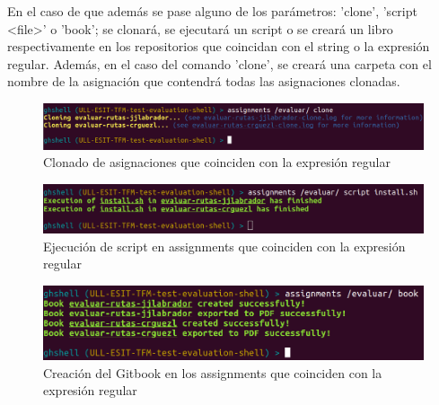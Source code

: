 \begin{itemize}
		
		En el caso de que además se pase alguno de los parámetros: 'clone', 'script \textless file\textgreater' o 'book'; se clonará, se ejecutará un script o se creará un libro respectivamente en los repositorios que coincidan con el string o la expresión regular. 
\bigskip		
		Además, en el caso del comando 'clone', se creará una carpeta con el nombre de la asignación que contendrá todas las asignaciones clonadas.
	
		\begin{figure}[H]
		\begin{center}
		\includegraphics[width=1\textwidth]{images/ghshell6-1}
		\caption{Clonado de asignaciones que coinciden con la expresión regular}
		\label{fig:ghshell6-1}
		\end{center}
		\end{figure}
		
		\begin{figure}[H]
		\begin{center}
		\includegraphics[width=1\textwidth]{images/assignments1-2}
		\caption{Ejecución de script en assignments que coinciden con la expresión regular}
		\label{fig:assignment1-2}
		\end{center}
		\end{figure}
		
		\begin{figure}[H]
		\begin{center}
		\includegraphics[width=1\textwidth]{images/assignments1-3}
		\caption{Creación del Gitbook en los assignments que coinciden con la expresión regular}
		\label{fig:assignment1-3}
		\end{center}
		\end{figure}
		

\end{itemize}
